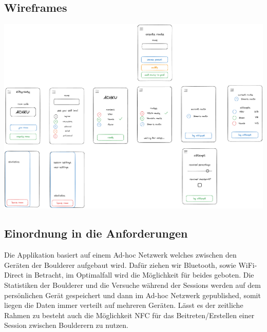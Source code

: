 \documentclass[11pt,a4paper,headsepline,footsepline,bibliography=totocnumbered]{article}
\begin{document}

  \subsection{Wireframes}
    \includegraphics[width=\textwidth]{pictures/KilterVote_GUI.png}

  \subsection{Einordnung in die Anforderungen}  
    \par  
      Die Applikation basiert auf einem Ad-hoc Netzwerk welches zwischen den Geräten der Boulderer aufgebaut wird.
      Dafür ziehen wir Bluetooth, sowie WiFi-Direct in Betracht, im Optimalfall wird die Möglichkeit für beides geboten.
      Die Statistiken der Boulderer und die Versuche während der Sessions werden auf dem persönlichen Gerät gespeichert und dann im Ad-hoc Netzwerk gepublished, somit liegen die Daten immer verteilt auf mehreren Geräten.
      Lässt es der zeitliche Rahmen zu besteht auch die Möglichkeit NFC für das Beitreten/Erstellen einer Session zwischen Boulderern zu nutzen.
    
\newpage
\end{document}
